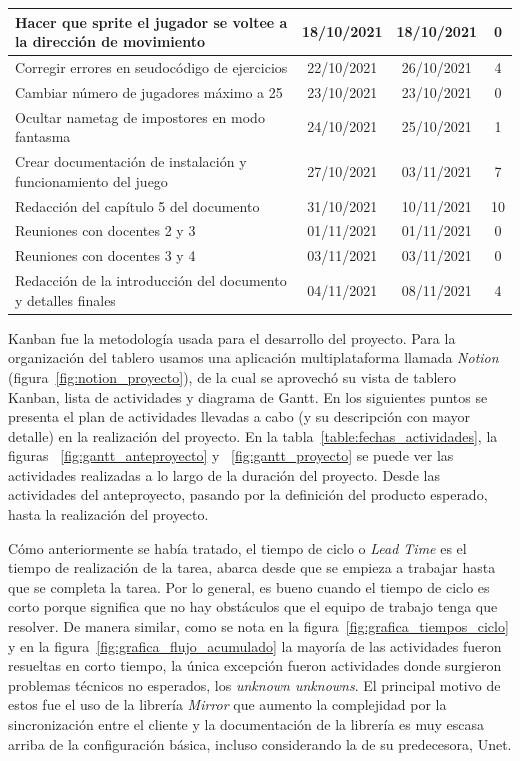 \begin{longtable}[c]{|m{5cm}|c|c|c|}
        Hacer que sprite el jugador se voltee a la dirección de movimiento & 18/10/2021 & 18/10/2021 & 0 \\ \hline
        Corregir errores en seudocódigo de ejercicios & 22/10/2021 & 26/10/2021 & 4 \\ \hline
        Cambiar número de jugadores máximo a 25 & 23/10/2021 & 23/10/2021 & 0 \\ \hline
        Ocultar nametag de impostores en modo fantasma & 24/10/2021 & 25/10/2021 & 1 \\ \hline
        Crear documentación de instalación y funcionamiento del juego & 27/10/2021 & 03/11/2021 & 7 \\ \hline
        Redacción del capítulo 5 del documento & 31/10/2021 & 10/11/2021 & 10 \\ \hline
        Reuniones con docentes 2 y 3 & 01/11/2021 & 01/11/2021 & 0 \\ \hline
        Reuniones con docentes 3 y 4 & 03/11/2021 & 03/11/2021 & 0 \\ \hline
        Redacción de la introducción del documento y detalles finales & 04/11/2021 & 08/11/2021 & 4 \\ \hline
\end{longtable}

Kanban fue la metodología usada para el desarrollo del proyecto. Para la organización del tablero usamos una aplicación multiplataforma llamada  \textit{Notion} (figura~\ref{fig:notion_proyecto}), de la cual se aprovechó su vista de tablero Kanban, lista de actividades y diagrama de Gantt. En los siguientes puntos se presenta el plan de actividades llevadas a cabo (y su descripción con mayor detalle) en la realización del proyecto. En la tabla~\ref{table:fechas_actividades}, la figuras ~\ref{fig:gantt_anteproyecto} y ~\ref{fig:gantt_proyecto} se puede ver las actividades realizadas a lo largo de la duración del proyecto. Desde las actividades del anteproyecto, pasando por la definición del producto esperado, hasta la realización del proyecto. 

Cómo anteriormente se había tratado, el tiempo de ciclo o \textit{Lead Time} es el tiempo de realización de la tarea, abarca desde que se empieza a trabajar hasta que se completa la tarea. Por lo general, es bueno cuando el tiempo de ciclo es corto porque significa que no hay obstáculos que el equipo de trabajo tenga que resolver. De manera similar, como se nota en la figura~\ref{fig:grafica_tiempos_ciclo} y en la figura~\ref{fig:grafica_flujo_acumulado} la mayoría de las actividades fueron resueltas en corto tiempo, la única excepción fueron actividades donde surgieron problemas técnicos no esperados, los \textit{unknown unknowns}. El principal motivo de estos fue el uso de la librería \textit{Mirror} que aumento la complejidad por la sincronización entre el cliente y la documentación de la librería es muy escasa arriba de la configuración básica, incluso considerando la de su predecesora, Unet.

